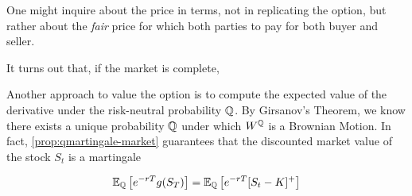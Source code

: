 \documentclass[../TGMAFFIRO.tex]{subfiles}
\begin{document}
 
 One might inquire about the price in terms, not in replicating the option, but rather about the \textit{fair} price for which both parties to pay for both buyer and seller. 
 
 It turns out that, if the market is complete, 
 
 Another approach to value the option is to compute the expected value of the derivative under the risk-neutral probability $\mathbb{Q}$. By Girsanov's Theorem, we know there exists a unique probability $\mathbb{Q}$ under which $W^{\mathbb{Q}}$ is a Brownian Motion. In fact, \ref{prop:qmartingale-market} guarantees that the discounted market value of the stock $S_t$ is a martingale
  
 \begin{equation}
 	\mathbb{E}_{\mathbb{Q}}\left[e^{-rT}g(S_T)\right] = \mathbb{E}_{\mathbb{Q}}\left[e^{-rT}[S_t - K]^+\right]
 \end{equation}

 
\end{document}
